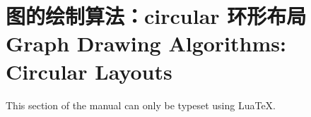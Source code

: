 %
%
%


\section{图的绘制算法：circular 环形布局 Graph Drawing Algorithms: Circular Layouts}

{}

\ifluatex
\else
    This section of the manual can only be typeset using Lua\TeX.
    \expandafter\endinput
\fi


\includeluadocumentationof{pgf.gd.circular.library}
\includeluadocumentationof{pgf.gd.circular.Tantau2012}


